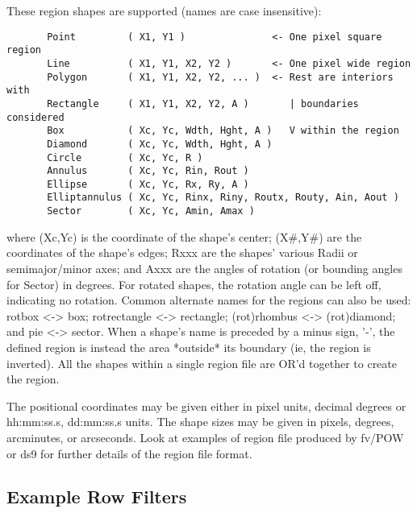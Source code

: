 \documentclass[11pt]{book}
\begin{document}
    These region shapes are supported (names are case insensitive):

\begin{verbatim}
       Point         ( X1, Y1 )               <- One pixel square region
       Line          ( X1, Y1, X2, Y2 )       <- One pixel wide region
       Polygon       ( X1, Y1, X2, Y2, ... )  <- Rest are interiors with
       Rectangle     ( X1, Y1, X2, Y2, A )       | boundaries considered
       Box           ( Xc, Yc, Wdth, Hght, A )   V within the region
       Diamond       ( Xc, Yc, Wdth, Hght, A )
       Circle        ( Xc, Yc, R )
       Annulus       ( Xc, Yc, Rin, Rout )
       Ellipse       ( Xc, Yc, Rx, Ry, A )
       Elliptannulus ( Xc, Yc, Rinx, Riny, Routx, Routy, Ain, Aout )
       Sector        ( Xc, Yc, Amin, Amax )
\end{verbatim}
    where (Xc,Yc) is  the coordinate of  the shape's center; (X\#,Y\#) are
    the coordinates  of the shape's edges;  Rxxx are the shapes' various
    Radii or semimajor/minor  axes; and Axxx  are the angles of rotation
    (or bounding angles for Sector) in degrees.  For rotated shapes, the
    rotation angle  can  be left  off, indicating  no rotation.   Common
    alternate  names for the regions  can also be  used: rotbox <-> box;
    rotrectangle <-> rectangle;  (rot)rhombus <-> (rot)diamond;  and pie
    <-> sector.  When a  shape's name is  preceded by a minus sign, '-',
    the defined region  is instead the area  *outside* its boundary (ie,
    the region is inverted).  All the shapes within a single region file
    are OR'd together to create the region.

    The positional coordinates may be given either in pixel units,
    decimal degrees or hh:mm:ss.s, dd:mm:ss.s units.  The shape sizes
    may be given in pixels, degrees, arcminutes, or arcseconds.  Look
    at examples of region file produced by fv/POW or ds9 for further
    details of the region file format.



\subsection{Example Row Filters}
\end{document}
